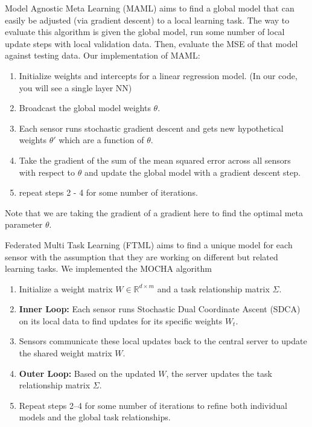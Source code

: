 \documentclass{article}
\begin{document}
Model Agnostic Meta Learning (MAML) \cite{finn2017} aims to find a global model that can easily be adjusted (via gradient descent) to a local learning task. The way to evaluate this algorithm is given the global model, run some number of local update steps with local validation data. Then, evaluate the MSE of that model against testing data.
Our implementation of MAML:
\begin{enumerate}
    \item Initialize weights and intercepts for a linear regression model. (In our code, you will see a single layer NN)
    \item Broadcast the global model weights $\theta$.
    \item Each sensor runs stochastic gradient descent and gets new hypothetical weights $\theta'$ which are a function of $\theta$.
    \item Take the gradient of the sum of the mean squared error across all sensors with respect to $\theta$ and update the global model with a gradient descent step.
    \item repeat steps 2 - 4 for some number of iterations.
\end{enumerate}
Note that we are taking the gradient of a gradient here to find the optimal meta parameter $\theta$.

Federated Multi Task Learning (FTML) aims to find a unique model for each sensor with the assumption that they are working on different but related learning tasks. We implemented the MOCHA algorithm \cite{smith2018} 

\begin{enumerate}
    \item Initialize a weight matrix $W \in \mathbb{R}^{d \times m}$ and a task relationship matrix $\Sigma$.
    \item \textbf{Inner Loop:} Each sensor runs Stochastic Dual Coordinate Ascent (SDCA) on its local data to find updates for its specific weights $W_t$.
    \item Sensors communicate these local updates back to the central server to update the shared weight matrix $W$.
    \item \textbf{Outer Loop:} Based on the updated $W$, the server updates the task relationship matrix $\Sigma$. 
    \item Repeat steps 2--4 for some number of iterations to refine both individual models and the global task relationships.
\end{enumerate}
\end{document}

